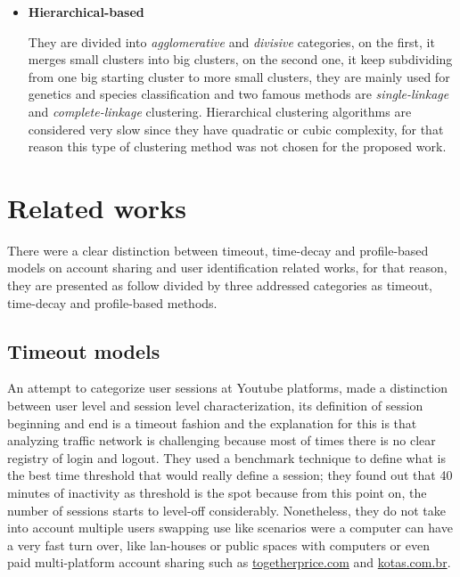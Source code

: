 \documentclass[ecp,tc,english]{iiufrgs}
\begin{document}
\begin{itemize}
            \item \textbf{Hierarchical-based}
            
            They are divided into \textit{agglomerative} and \textit{divisive} categories, on the first, it merges small clusters into big clusters, on the second one, it keep subdividing from one big starting cluster to more small clusters, they are mainly used for genetics and species classification and two famous methods are \textit{single-linkage} and \textit{complete-linkage} \cite{johnson1967, sibson1973} clustering. Hierarchical clustering algorithms are considered very slow since they have quadratic or cubic complexity, for that reason this type of clustering method was not chosen for the proposed work.
        \end{itemize}


\chapter{Related works} \label{related_works}
There were a clear distinction between timeout, time-decay and profile-based models on account sharing and user identification related works, for that reason, they are presented as follow divided by three addressed categories as timeout, time-decay and profile-based methods.

\section{Timeout models}

An attempt to categorize user sessions at Youtube platforms, \cite{gill2008} made a distinction between user level and session level characterization, its definition of session beginning and end is a timeout fashion and the explanation for this is that analyzing traffic network is challenging because most of times there is no clear registry of login and logout. They used a benchmark technique to define what is the best time threshold that would really define a session; they found out that 40 minutes of inactivity as threshold is the spot because from this point on, the number of sessions starts to level-off considerably.
Nonetheless, they do not take into account multiple users swapping use like scenarios were a computer can have a very fast turn over, like lan-houses or public spaces with computers or even paid multi-platform account sharing such as \url{togetherprice.com} and \url{kotas.com.br}.
\end{document}

